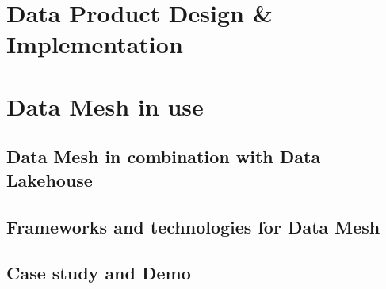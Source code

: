 \documentclass[12pt, a4paper]{book}
\begin{document}
\chapter{Data Product Design \& Implementation}

\chapter{Data Mesh in use}
\section{Data Mesh in combination with Data Lakehouse}

\section{Frameworks and technologies for Data Mesh}

\section{Case study and Demo}


\begingroup
\backmatter
{}
\renewcommand\bibname{References}

\endgroup

\clearpage
\end{document}
